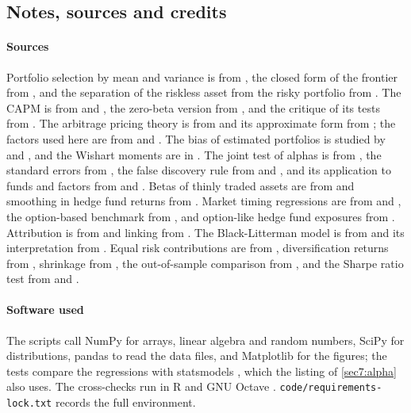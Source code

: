 \begin{chapterrefs}
\FloatBarrier
\section{Notes, sources and credits}
\label{sec7:credits}

\paragraph{Sources}
Portfolio selection by mean and variance is from \textcite{markowitz1952}, the closed form of the
frontier from \textcite{merton1972}, and the separation of the riskless asset from the risky portfolio
from \textcite{tobin1958}. The CAPM is from \textcite{sharpe1964} and \textcite{lintner1965}, the
zero-beta version from \textcite{black1972}, and the critique of its tests from \textcite{roll1977}. The
arbitrage pricing theory is from \textcite{ross1976} and its approximate form from \textcite{huberman1982}; the factors used here are from
\textcite{fama1993,fama2015} and \textcite{carhart1997}. The bias of estimated portfolios is studied by
\textcite{michaud1989} and \textcite{kan2007}, and the Wishart moments are in \textcite{muirhead1982}.
The joint test of alphas is from \textcite{gibbons1989}, the standard errors from \textcite{newey1987},
the false discovery rule from \textcite{benjamini1995} and \textcite{storey2002}, and its application to
funds and factors from \textcite{barras2010} and \textcite{harvey2016}. Betas of thinly traded assets are
from \textcite{dimson1979} and smoothing in hedge fund returns from \textcite{getmansky2004}. Market
timing regressions are from \textcite{treynor1966} and \textcite{henriksson1981}, the option-based
benchmark from \textcite{glosten1994}, and option-like hedge fund exposures from \textcite{agarwal2004}.
Attribution is from \textcite{brinson1985,brinson1986} and linking from \textcite{carino1999}. The
Black-Litterman model is from \textcite{black1992} and its interpretation from \textcite{he2002}. Equal
risk contributions are from \textcite{maillard2010}, diversification returns from \textcite{booth1992},
shrinkage from \textcite{ledoit2004}, the out-of-sample comparison from \textcite{demiguel2009}, and the
Sharpe ratio test from \textcite{jobson1981} and \textcite{memmel2003}.

\paragraph{Software used}
The scripts call NumPy \parencite{numpy} for arrays, linear algebra and random numbers, SciPy \parencite{scipy} for
distributions, pandas \parencite{pandas} to read the data files, and Matplotlib \parencite{matplotlib} for the figures; the
tests compare the regressions with statsmodels \parencite{statsmodels}, which the listing of
\cref{sec7:alpha} also uses. The cross-checks run in R \parencite{rcore} and
GNU Octave \parencite{octave}. \texttt{code/requirements-lock.txt} records the full environment.


\end{chapterrefs}
